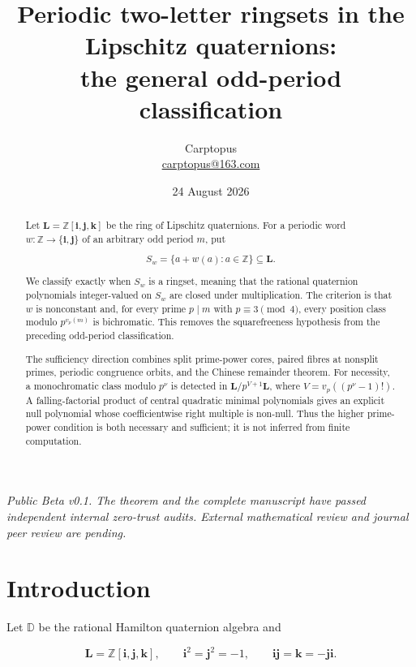 \documentclass[11pt]{article}
\title{Periodic two-letter ringsets in the Lipschitz quaternions:\\
the general odd-period classification}
\author{Carptopus\\\href{mailto:carptopus@163.com}{carptopus@163.com}}
\date{24 August 2026}
\numberwithin{equation}{section}
\begin{document}
\maketitle

\begin{center}
\small\itshape
Public Beta v0.1. The theorem and the complete manuscript have passed
independent internal zero-trust audits. External mathematical review and
journal peer review are pending.
\end{center}
\vspace{0.8em}

\begin{abstract}

Let $\mathbf L=\mathbb Z[\mathbf i,\mathbf j,\mathbf k]$ be the ring of
Lipschitz quaternions. For a periodic word
$w:\mathbb Z\to\{\mathbf i,\mathbf j\}$ of an arbitrary odd period $m$, put

\[
S_w=\{a+w(a):a\in\mathbb Z\}\subseteq\mathbf L.
\]

We classify exactly when $S_w$ is a ringset, meaning that the rational
quaternion polynomials integer-valued on $S_w$ are closed under
multiplication. The criterion is that $w$ is nonconstant and, for every prime
$p\mid m$ with $p\equiv3\pmod4$, every position class modulo
$p^{v_p(m)}$ is bichromatic. This removes the squarefreeness hypothesis from
the preceding odd-period classification.

The sufficiency direction combines split prime-power cores, paired fibres at
nonsplit primes, periodic congruence orbits, and the Chinese remainder
theorem. For necessity, a monochromatic class modulo $p^\nu$ is detected in
$\mathbf L/p^{V+1}\mathbf L$, where
$V=v_p((p^\nu-1)!)$. A falling-factorial product of central quadratic
minimal polynomials gives an explicit null polynomial whose coefficientwise
right multiple is non-null. Thus the higher prime-power condition is both
necessary and sufficient; it is not inferred from finite computation.

\end{abstract}

\section{Introduction}


Let $\mathbb D$ be the rational Hamilton quaternion algebra and

\[
\mathbf L=\mathbb Z[\mathbf i,\mathbf j,\mathbf k],
\qquad
\mathbf i^2=\mathbf j^2=-1,
\qquad
\mathbf i\mathbf j=\mathbf k=-\mathbf j\mathbf i.
\]
\end{document}
